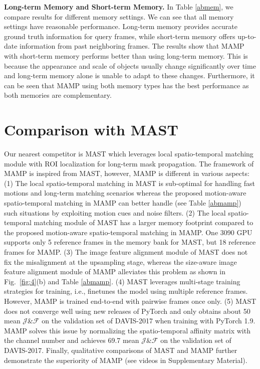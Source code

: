 \documentclass[letterpaper]{article} \usepackage{aaai22}  \usepackage{times}  \usepackage{helvet}  \usepackage{courier}  \usepackage[hyphens]{url}  \usepackage{graphicx} \urlstyle{rm} \def\UrlFont{\rm}  \usepackage{natbib}  \usepackage{caption} \DeclareCaptionStyle{ruled}{labelfont=normalfont,labelsep=colon,strut=off} \frenchspacing  \setlength{\pdfpagewidth}{8.5in}  \setlength{\pdfpageheight}{11in}  \usepackage{algorithm}
\begin{document}
\noindent\textbf{Long-term Memory and Short-term Memory.} In Table \ref{abmem}, we compare results for different memory settings. We can see that all memory settings have reasonable performance. Long-term memory provides accurate ground truth information for query frames, while short-term memory offers up-to-date information from past neighboring frames. The results show that MAMP with short-term memory performs better than using long-term memory. This is because the appearance and scale of objects usually change significantly over time and long-term memory alone is unable to adapt to these changes. Furthermore, it can be seen that MAMP using both memory types has the best performance as both memories are complementary.

\section{Comparison with MAST}
Our nearest competitor is MAST \cite{MAST} which leverages local spatio-temporal matching module with ROI localization for long-term mask propagation. The framework of MAMP is inspired from MAST, however, MAMP is different in various aspects: (1) The local spatio-temporal matching in MAST is sub-optimal for handling fast motions and long-term matching scenarios whereas the proposed motion-aware spatio-temporal matching in MAMP can better handle (see Table \ref{abmamp}) such situations by exploiting motion cues and noise filters. (2) The local spatio-temporal matching module of MAST has a larger memory footprint compared to the proposed motion-aware spatio-temporal matching in MAMP. One 3090 GPU supports only 5 reference frames in the memory bank for MAST, but 18 reference frames for MAMP. (3) The image feature alignment module of MAST does not fix the misalignment at the upsampling stage, whereas the size-aware image feature alignment module of MAMP alleviates this problem as shown in Fig.~\ref{fig:4}(b) and Table \ref{abmamp}. (4) MAST leverages multi-stage training strategies for training, i.e., finetunes the model using multiple reference frames. However, MAMP is trained end-to-end with pairwise frames once only. (5) MAST does not converge well using new releases of PyTorch and only obtains about 50 mean \( \mathcal{J} \)\&\( \mathcal{F} \) on the validation set of DAVIS-2017 when training with PyTorch 1.9. MAMP solves this issue by normalizing the spatio-temporal affinity matrix with the channel number and achieves 69.7 mean \( \mathcal{J} \)\&\( \mathcal{F} \) on the validation set of DAVIS-2017. Finally, qualitative comparisons of MAST and MAMP further demonstrate the superiority of MAMP (see videos in Supplementary Material).
\end{document}
